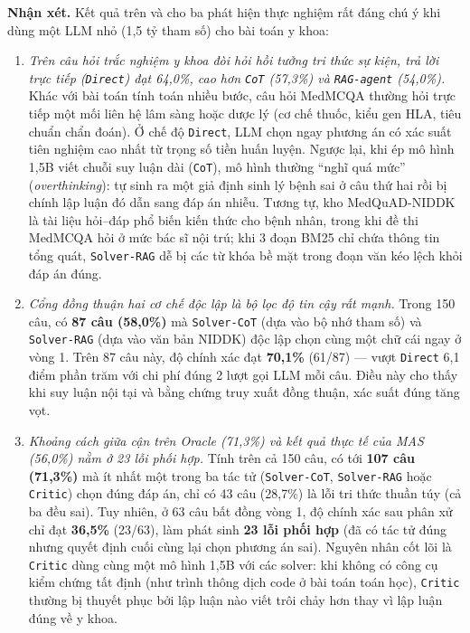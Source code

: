 
\textbf{Nhận xét.} Kết quả trên  và  cho ba phát hiện thực nghiệm rất đáng chú ý khi dùng một LLM nhỏ (1,5 tỷ tham số) cho bài toán y khoa:
\begin{enumerate}
  \item \emph{Trên câu hỏi trắc nghiệm y khoa đòi hỏi hồi tưởng tri thức sự kiện, trả lời trực tiếp (\texttt{Direct}) đạt 64,0\%, cao hơn \texttt{CoT} (57,3\%) và \texttt{RAG-agent} (54,0\%).} Khác với bài toán tính toán nhiều bước, câu hỏi MedMCQA thường hỏi trực tiếp một mối liên hệ lâm sàng hoặc dược lý (cơ chế thuốc, kiểu gen HLA, tiêu chuẩn chẩn đoán). Ở chế độ \texttt{Direct}, LLM chọn ngay phương án có xác suất tiên nghiệm cao nhất từ trọng số tiền huấn luyện. Ngược lại, khi ép mô hình 1,5B viết chuỗi suy luận dài (\texttt{CoT}), mô hình thường ``nghĩ quá mức'' (\emph{overthinking}): tự sinh ra một giả định sinh lý bệnh sai ở câu thứ hai rồi bị chính lập luận đó dẫn sang đáp án nhiễu. Tương tự, kho MedQuAD-NIDDK là tài liệu hỏi–đáp phổ biến kiến thức cho bệnh nhân, trong khi đề thi MedMCQA hỏi ở mức bác sĩ nội trú; khi 3 đoạn BM25 chỉ chứa thông tin tổng quát, \texttt{Solver-RAG} dễ bị các từ khóa bề mặt trong đoạn văn kéo lệch khỏi đáp án đúng.
  \item \emph{Cổng đồng thuận hai cơ chế độc lập là bộ lọc độ tin cậy rất mạnh.} Trong 150 câu, có \textbf{87 câu (58,0\%)} mà \texttt{Solver-CoT} (dựa vào bộ nhớ tham số) và \texttt{Solver-RAG} (dựa vào văn bản NIDDK) độc lập chọn cùng một chữ cái ngay ở vòng 1. Trên 87 câu này, độ chính xác đạt \textbf{70,1\%} (61/87) — vượt \texttt{Direct} 6,1 điểm phần trăm với chi phí đúng 2 lượt gọi LLM mỗi câu. Điều này cho thấy khi suy luận nội tại và bằng chứng truy xuất đồng thuận, xác suất đúng tăng vọt.
  \item \emph{Khoảng cách giữa cận trên Oracle (71,3\%) và kết quả thực tế của MAS (56,0\%) nằm ở 23 lỗi phối hợp.} Tính trên cả 150 câu, có tới \textbf{107 câu (71,3\%)} mà ít nhất một trong ba tác tử (\texttt{Solver-CoT}, \texttt{Solver-RAG} hoặc \texttt{Critic}) chọn đúng đáp án, chỉ có 43 câu (28,7\%) là lỗi tri thức thuần túy (cả ba đều sai). Tuy nhiên, ở 63 câu bất đồng vòng 1, độ chính xác sau phân xử chỉ đạt \textbf{36,5\%} (23/63), làm phát sinh \textbf{23 lỗi phối hợp} (đã có tác tử đúng nhưng quyết định cuối cùng lại chọn phương án sai). Nguyên nhân cốt lõi là \texttt{Critic} dùng cùng một mô hình 1,5B với các solver: khi không có công cụ kiểm chứng tất định (như trình thông dịch code ở bài toán toán học), \texttt{Critic} thường bị thuyết phục bởi lập luận nào viết trôi chảy hơn thay vì lập luận đúng về y khoa.
\end{enumerate}


